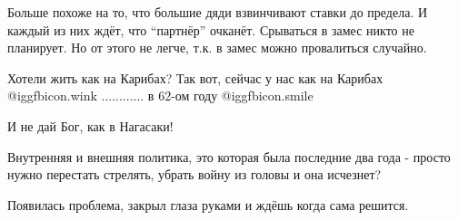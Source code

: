  
 
 
 
 
\zzSecCmt

\begin{itemize} %

Больше похоже на то, что большие дяди взвинчивают ставки до предела. И каждый
из них ждёт, что \enquote{партнёр} очканёт. Срываться в замес никто не планирует. Но от
этого не легче, т.к. в замес можно провалиться случайно.


Хотели жить как на Карибах? Так вот, сейчас у нас как на Карибах
@igg{fbicon.wink} ............ в 62-ом году  @igg{fbicon.smile} 

И не дай Бог, как в Нагасаки!


Внутренняя и внешняя политика, это которая была последние два года - просто
нужно перестать стрелять, убрать войну из головы и она исчезнет?

Появилась проблема, закрыл глаза руками и ждёшь когда сама решится.
\end{itemize} %
